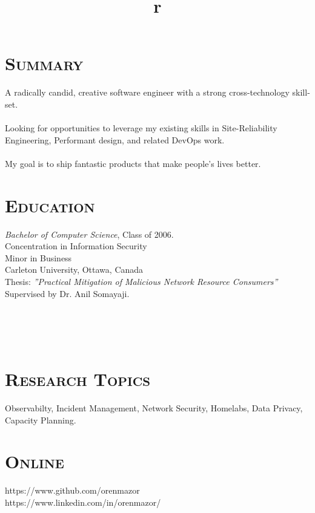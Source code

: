 \begin{resume}


\section{\textsc{Summary}}
A radically candid, creative software engineer with a strong cross-technology skill-set.\\\\Looking for opportunities to leverage my existing skills in Site-Reliability Engineering, Performant design, and related DevOps work.\\\\My goal is to ship fantastic products that make people's lives better.

\section{\textsc{Education}}

\textit{Bachelor of Computer Science}, Class of 2006. \\
Concentration in Information Security \\
Minor in Business \\
Carleton University, Ottawa, Canada \\
Thesis: \textit{''Practical Mitigation of Malicious Network Resource Consumers''} \\
Supervised by Dr. Anil Somayaji. 


\begin{formatb}
  \title{r}\\
  \\
  \body\\
\end{formatb}

\section{\textsc{Research Topics}}

Observabilty, Incident Management, Network Security, Homelabs, Data Privacy, Capacity Planning.

\section{\textsc{Online}}
https://www.github.com/orenmazor\\
https://www.linkedin.com/in/orenmazor/


\end{resume}
